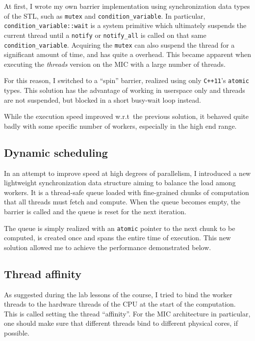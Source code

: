 \documentclass[a4paper,11pt]{article}
\newcommand{\code}[1]{\texttt{#1}}
\def\+{\discretionary{}{}{}}
\begin{document}
At first, I wrote my own barrier implementation using synchronization data types of the STL, such as \code{mutex} and \code{condition\_variable}. In particular, \code{condition\_variable::\+wait} is a system primitive which ultimately suspends the current thread until a \code{notify} or \code{notify\_all} is called on that same \code{condition\_variable}. Acquiring the \code{mutex} can also suspend the thread for a significant amount of time, and has quite a overhead. This became apparent when executing the \emph{threads} version on the MIC with a large number of threads.

For this reason, I switched to a ``spin'' barrier, realized using only \code{C++11}'s \code{atomic} types. This solution has the advantage of working in userspace only and threads are not suspended, but blocked in a short busy-wait loop instead.

While the execution speed improved w.r.t\ the previous solution, it behaved quite badly with some specific number of workers, especially in the high end range.

\subsection{Dynamic scheduling}

In an attempt to improve speed at high degrees of parallelism, I introduced a new light\-weight synchronization data structure aiming to balance the load among workers. It is a thread-safe queue loaded with fine-grained chunks of computation that all threads must fetch and compute. When the queue becomes empty, the barrier is called and the queue is reset for the next iteration.

The queue is simply realized with an \code{atomic} pointer to the next chunk to be computed, is created once and spans the entire time of execution. This new solution allowed me to achieve the performance demonstrated below.

\subsection{Thread affinity}

As suggested during the lab lessons of the course, I tried to bind the worker threads to the hardware threads of the CPU at the start of the computation. This is called setting the thread ``affinity''. For the MIC architecture in particular, one should make sure that different threads bind to different physical cores, if possible.
\end{document}
